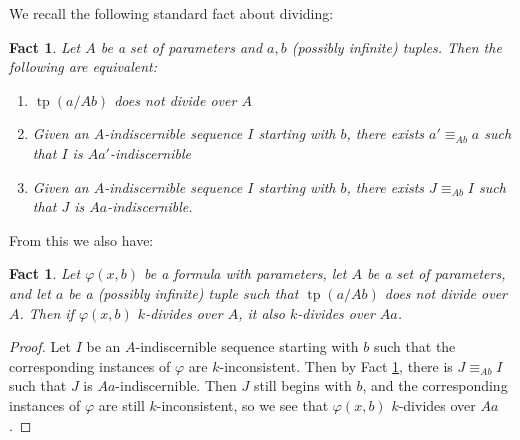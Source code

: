 \documentclass{article}
\DeclareMathOperator{\tp}{tp}
\newtheorem{fact}[theorem]{Fact}
\theoremstyle{remark}
\theoremstyle{definition}
\begin{document}
We recall the following standard fact about dividing:
\begin{fact}\label{Standard}
    Let $A$ be a set of parameters and $a,b$ (possibly infinite) tuples. Then the following are equivalent:
    \begin{enumerate}
        \item $\tp(a/Ab)$ does not divide over $A$
        \item Given an $A$-indiscernible sequence $I$ starting with $b$, there exists $a'\equiv_{Ab}a$ such that $I$ is $Aa'$-indiscernible
        \item Given an $A$-indiscernible sequence $I$ starting with $b$, there exists $J\equiv_{Ab} I$ such that $J$ is $Aa$-indiscernible.
    \end{enumerate}
\end{fact}
From this we also have:
\begin{fact}\label{DivFact}
    Let $\varphi(x,b)$ be a formula with parameters, let $A$ be a set of parameters, and let $a$ be a (possibly infinite) tuple such that $\tp(a/Ab)$ does not divide over $A$. Then if $\varphi(x,b)$ $k$-divides over $A$, it also $k$-divides over $Aa$.
\end{fact}
\begin{proof}
    Let $I$ be an $A$-indiscernible sequence starting with $b$ such that the corresponding instances of $\varphi$ are $k$-inconsistent. Then by Fact \ref{Standard}, there is $J\equiv_{Ab} I$ such that $J$ is $Aa$-indiscernible. Then $J$ still begins with $b$, and the corresponding instances of $\varphi$ are still $k$-inconsistent, so we see that $\varphi(x,b)$ $k$-divides over $Aa$.
\end{proof}
\end{document}

